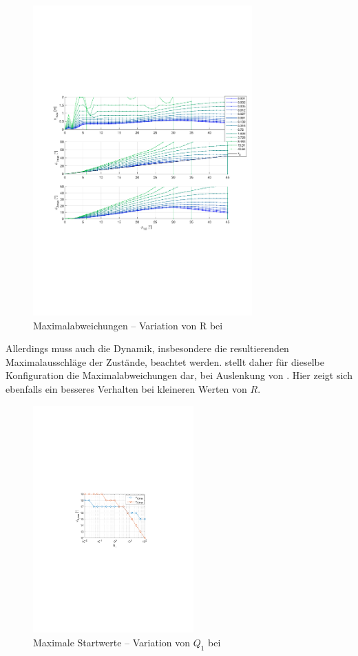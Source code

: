 \begin{figure}[tbp]
	\centering
		\includegraphics[width=0.75\textwidth]{Bilder/QRVariation/ap2/R phi1 m.pdf}
	\caption{Maximalabweichungen -- Variation von R bei \apz}
	\label{fig:qrap2Rm}
\end{figure}

Allerdings muss auch die Dynamik, insbesondere die resultierenden Maximalausschläge der Zustände, beachtet werden.
 stellt daher für dieselbe Konfiguration die Maximalabweichungen dar, bei Auslenkung von \phe.
Hier zeigt sich ebenfalls ein besseres Verhalten bei kleineren Werten von $R$.

\begin{figure}[tbp]
	\centering
		\includegraphics[width=0.55\textwidth]{Bilder/QRVariation/ap4/q1 phi12.pdf}
		\caption{Maximale Startwerte -- Variation von $Q_1$ bei \apv}
	\label{fig:qrap4q1}
\end{figure}

